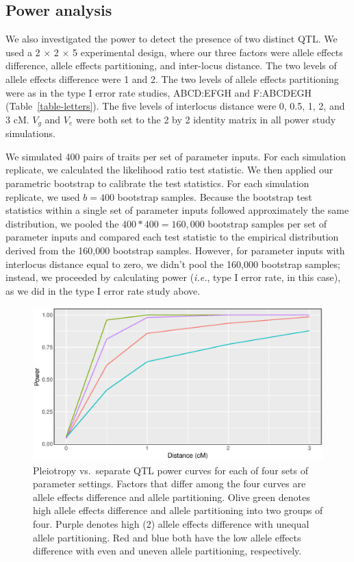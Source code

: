 \documentclass[12pt,twoside, lineno]{gsajnl}
\begin{document}
\subsection{Power analysis}

We also investigated the power to detect the presence of two
distinct QTL. We used a 2 $\times$ 2 $\times$ 5 experimental design, where our
three factors were allele effects difference, allele effects
partitioning, and inter-locus distance. The two levels of allele
effects difference were 1 and 2. The two levels of allele effects
partitioning were as in the type I error rate studies, ABCD:EFGH and
F:ABCDEGH (Table~\ref{table-letters}). The five levels of interlocus
distance were 0, 0.5, 1, 2, and 3 cM. $V_g$ and $V_e$ were both set to
the 2 by 2 identity matrix in all power study simulations.

We simulated 400 pairs of traits per set of parameter inputs. For
each simulation replicate, we calculated the likelihood ratio test
statistic. We then applied our parametric bootstrap to calibrate the
test statistics. For each simulation replicate, we used $b = 400$ bootstrap
samples. Because the bootstrap test statistics within a single set of
parameter inputs followed approximately the same distribution, we
pooled the $400 * 400 = 160,000$ bootstrap samples per set of
parameter inputs and compared each test statistic to the empirical
distribution derived from the 160,000 bootstrap samples. However, for
parameter inputs with interlocus distance equal to zero, we didn't
pool the 160,000 bootstrap samples; instead, we proceeded by
calculating power (\textit{i.e.}, type I error rate, in this case), as we did in the
type I error rate study above.

\begin{figure}
\includegraphics[width = \textwidth]{../R/power-curves.eps}
\caption{Pleiotropy vs.\ separate QTL power curves for each of four
  sets of parameter settings. Factors that differ among the four
  curves are allele effects difference and allele partitioning. Olive
  green denotes high allele effects difference and allele
  partitioning into two groups of four. Purple denotes high (2) allele
  effects difference with unequal allele partitioning. Red and blue
  both have the low allele effects difference with even and
  uneven allele partitioning, respectively.}
\label{fig:power}
\end{figure}
\end{document}

